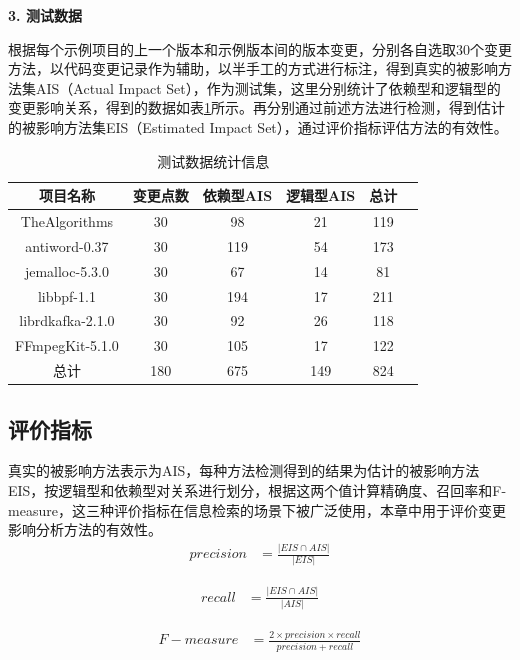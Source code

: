 \noindent \textbf{3. 测试数据}

根据每个示例项目的上一个版本和示例版本间的版本变更，分别各自选取30个变更方法，以代码变更记录作为辅助，以半手工的方式进行标注，得到真实的被影响方法集AIS（Actual Impact Set），作为测试集，这里分别统计了依赖型和逻辑型的变更影响关系，得到的数据如表\ref{1_test_data_info}所示。再分别通过前述方法进行检测，得到估计的被影响方法集EIS（Estimated Impact Set），通过评价指标评估方法的有效性。

\begin{table}[htbp]
\caption{测试数据统计信息}
\label{1_test_data_info}
\vspace{0.5em}\centering\wuhao
\begin{tabular}{cccccc}
\toprule
项目名称  & 变更点数 & 依赖型AIS & 逻辑型AIS & 总计 \\
\midrule
TheAlgorithms  & 30 & 98 & 21 & 119\\
antiword-0.37  & 30 & 119 & 54 & 173 \\
jemalloc-5.3.0   & 30 & 67 & 14 & 81 \\
libbpf-1.1  & 30 & 194 & 17 & 211 \\
librdkafka-2.1.0  & 30 & 92 & 26 & 118\\
FFmpegKit-5.1.0  & 30 & 105 & 17 & 122\\
总计  & 180 & 675 & 149 & 824 \\
\bottomrule
\end{tabular}
\end{table}


\subsection{评价指标}\label{1_评价指标}

真实的被影响方法表示为AIS，每种方法检测得到的结果为估计的被影响方法EIS，按逻辑型和依赖型对关系进行划分，根据这两个值计算精确度、召回率和F-measure，这三种评价指标在信息检索的场景下被广泛使用，本章中用于评价变更影响分析方法的有效性。
\begin{align}
precision &= \frac{|EIS \cap AIS|}{|EIS|} 
\end{align}

\begin{align}
recall &= \frac{|EIS \cap AIS|}{|AIS|}  
\end{align}

\begin{align}
F-measure &= \frac{2 \times precision \times recall}{precision + recall} 
\end{align}


